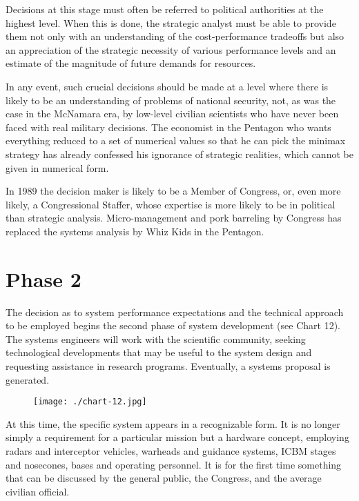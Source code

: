 Decisions at this stage must often be referred to political authorities at the highest level. When this is done, the strategic analyst must be able to provide them not only with an understanding of the cost-performance tradeoffs but also an appreciation of the strategic necessity of various performance levels and an estimate of the magnitude of future demands for resources.

In any event, such crucial decisions should be made at a level where there is likely to be an understanding of problems of national security, not, as was the case in the McNamara era, by low-level civilian scientists who have never been faced with real military decisions. The economist in the Pentagon who wants everything reduced to a set of numerical values so that he can pick the minimax strategy has already confessed his ignorance of strategic realities, which cannot be given in numerical form.

In 1989 the decision maker is likely to be a Member of Congress, or, even more likely, a Congressional Staffer, whose expertise is more likely to be in political than strategic analysis. Micro-management and pork barreling by Congress has replaced the systems analysis by Whiz Kids in the Pentagon.

\section{Phase 2}
The decision as to system performance expectations and the technical approach to be employed begins the second phase of system development (see Chart 12). The systems engineers will work with the scientific community, seeking technological developments that may be useful to the system design and requesting assistance in research programs. Eventually, a systems proposal is generated.

\begin{figure}
    \texttt{[image: ./chart-12.jpg]}
    \label{fig:chart-12}
\end{figure}

At this time, the specific system appears in a recognizable form. It is no longer simply a requirement for a particular mission but a hardware concept, employing radars and interceptor vehicles, warheads and guidance systems, ICBM stages and nosecones, bases and operating personnel. It is for the first time something that can be discussed by the general public, the Congress, and the average civilian official.

